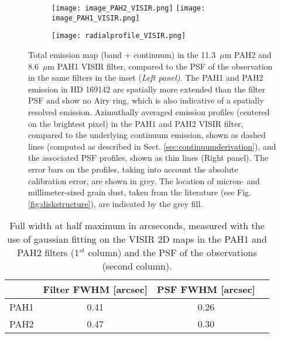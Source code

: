 \documentclass{aa}
\newcommand{\mic}{~$\mu$m\xspace}
\begin{document}
\begin{figure}[ht]
    \centering
    \begin{subfigure}{0.25\textwidth}
    \texttt{[image: image\_PAH2\_VISIR.png]}
    \texttt{[image: image\_PAH1\_VISIR.png]}
    \end{subfigure}
    \begin{subfigure}{0.23\textwidth}
        \texttt{[image: radialprofile\_VISIR.png]}
    \end{subfigure}
    \caption{Total emission map (band + continuum) in the 11.3\mic PAH2 and 8.6\mic PAH1 VISIR filter, compared to the PSF of the observation in the same filters in the inset (\textit{Left panel)}. The PAH1 and PAH2 emission in HD 169142 are spatially more extended than the filter PSF and show no Airy ring, which is also indicative of a spatially resolved emission. Azimuthally averaged emission profiles (centered on the brightest pixel) in the PAH1 and PAH2 VISIR filter, compared to the underlying continuum emission, shown as dashed lines (computed as described in Sect. \ref{sec:continuumderivation}), and the associated PSF profiles, shown as thin lines (Right
panel). The error bars on the profiles, taking into account the absolute calibration error, are shown in grey. The location of micron- and millimeter-sized grain dust, taken from the literature (see Fig. \ref{fig:diskstructure}), are indicated by the grey fill.}
    \label{fig:VISIRphotodata}
\end{figure}

\begin{table}[!ht]
    \centering
    \caption{Full width at half maximum in arcseconds, measured with the use of gaussian fitting on the VISIR 2D maps in the PAH1 and PAH2 filters (1$^{st}$ column) and the PSF of the observations (second column).}
    \begin{tabular}{cccc}
        \hline
          & Filter FWHM [arcsec] & PSF FWHM [arcsec]\\
        \hline
         PAH1 & 0.41 & 0.26\\
         PAH2 & 0.47 & 0.30\\
        \hline
    \end{tabular}
    \label{tab:fwhms}
\end{table}
\end{document}
